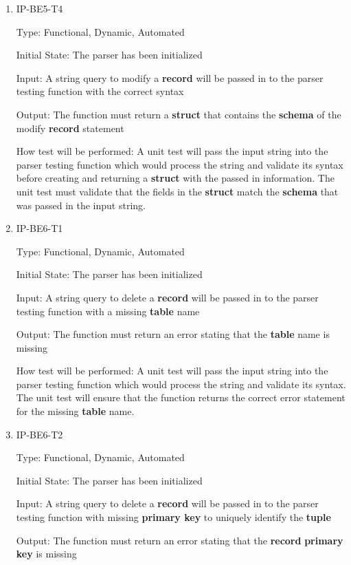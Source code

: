 \documentclass[12pt, titlepage]{article}
\begin{document}
\begin{enumerate}
\item{IP-BE5-T4}

Type: Functional, Dynamic, Automated
					
Initial State: The parser has been initialized
					
Input: A string query to modify a \textbf{record} will be passed in to the parser testing function with the correct syntax
					
Output: The function must return a \textbf{struct} that contains the \textbf{schema} of the modify \textbf{record} statement
					
How test will be performed: A unit test will pass the input string into the parser testing function which would process the string and validate its syntax before creating and returning a \textbf{struct} with the passed in information. The unit test must validate that the fields in the \textbf{struct} match the \textbf{schema} that was passed in the input string.

\item{IP-BE6-T1}

Type: Functional, Dynamic, Automated
					
Initial State: The parser has been initialized
					
Input: A string query to delete a \textbf{record} will be passed in to the parser testing function with a missing \textbf{table} name
					
Output: The function must return an error stating that the \textbf{table} name is missing
					
How test will be performed: A unit test will pass the input string into the parser testing function which would process the string and validate its syntax. The unit test will ensure that the function returns the correct error statement for the missing \textbf{table} name.

\item{IP-BE6-T2}

Type: Functional, Dynamic, Automated
					
Initial State: The parser has been initialized
					
Input: A string query to delete a \textbf{record} will be passed in to the parser testing function with missing \textbf{primary key} to uniquely identify the \textbf{tuple}
					
Output: The function must return an error stating that the \textbf{record} \textbf{primary key} is missing
					

\end{enumerate}
\end{document}
